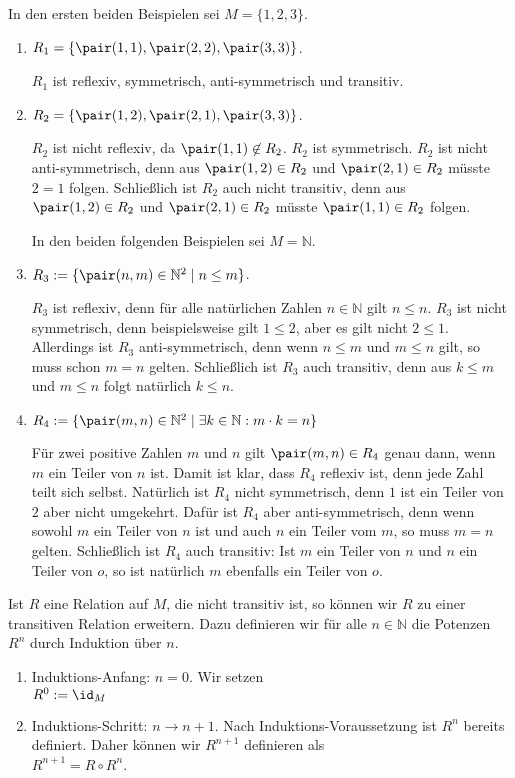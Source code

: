 \examples
In den ersten beiden Beispielen sei $M = \{1,2,3\}$.
\begin{enumerate}
\item $R_1 = \{ \pair(1,1), \pair(2,2), \pair(3,3) \}$.

      $R_1$ ist reflexiv, symmetrisch, anti-symmetrisch und transitiv.
\item $R_2 = \{ \pair(1,2), \pair(2,1), \pair(3,3) \}$.

      $R_2$ ist nicht reflexiv, da $\pair(1,1) \not\in R_2$.
      $R_2$ ist symmetrisch. 
      $R_2$ ist nicht anti-symmetrisch, denn aus $\pair(1,2) \in R_2$ und 
      $\pair(2,1) \in R_2$ müsste $2=1$ folgen.
      Schließlich ist $R_2$ auch nicht transitiv, denn aus $\pair(1,2) \in R_2$ und 
      $\pair(2,1) \in R_2$ müsste $\pair(1,1) \in R_2$ folgen.

      In den beiden folgenden Beispielen sei $M = \mathbb{N}$.
\item $R_3 := \{ \pair(n,m) \in \mathbb{N}^2 \mid n \leq m \}$.

      $R_3$ ist reflexiv, denn für alle natürlichen Zahlen $n \in \mathbb{N}$ gilt 
      $n \leq n$.  $R_3$ ist nicht symmetrisch, denn beispielsweise gilt
      $1 \leq 2$, aber es gilt nicht $2 \leq 1$.  Allerdings ist $R_3$ anti-symmetrisch,
      denn wenn $n \leq m$  und $m \leq n$ gilt, so muss schon $m = n$ gelten.
      Schließlich ist $R_3$ auch transitiv, denn aus $k \leq m$ und $m \leq n$ folgt
      natürlich $k \leq n$.
\item $R_4 := \{ \pair(m,n) \in \mathbb{N}^2 \mid \exists k\in \mathbb{N}: m\cdot k = n \}$

      Für zwei positive Zahlen $m$ und $n$ gilt $\pair(m,n) \in R_4$ genau dann, wenn $m$ ein
      Teiler von $n$ ist.  Damit ist klar, dass $R_4$ reflexiv ist, denn jede Zahl
      teilt sich selbst.  Natürlich ist $R_4$ nicht symmetrisch, denn $1$ ist ein Teiler
      von $2$ aber nicht umgekehrt.  Dafür ist $R_4$ aber anti-symmetrisch, denn wenn 
      sowohl $m$ ein Teiler von $n$ ist und auch $n$ ein Teiler vom $m$, so muss $m = n$
      gelten.  Schließlich ist $R_4$ auch transitiv: Ist $m$ ein Teiler von $n$ und
      $n$ ein Teiler von $o$, so ist natürlich $m$ ebenfalls ein Teiler von $o$.
      \eox
\end{enumerate}
Ist $R$ eine Relation auf $M$, die nicht transitiv ist, so können wir $R$ zu einer
transitiven Relation erweitern.  Dazu definieren wir für alle $n \in \mathbb{N}$ die
Potenzen $R^n$ durch Induktion über $n$.
\begin{enumerate}
\item Induktions-Anfang: $n= 0$.  Wir setzen \\[0.2cm]
      \hspace*{1.3cm} $R^0 := \id_M$
\item Induktions-Schritt: $n \rightarrow n + 1$. Nach Induktions-Voraussetzung ist $R^n$
      bereits definiert. Daher können wir $R^{n+1}$ definieren als \\[0.2cm]
      \hspace*{1.3cm} $R^{n+1} = R \circ R^n$.
\end{enumerate}
